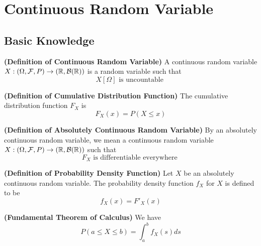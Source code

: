 \documentclass{report}
\begin{document}
\chapter{Continuous Random Variable}
\section{Basic Knowledge}
\begin{definition}
\label{2.0.1}
\textbf{(Definition of Continuous Random Variable)} A continuous random variable $X:(\Omega,\mathcal{F},P)\rightarrow (\mathbb{R},\mathcal{B}(\mathbb{R}))$ is a random variable such that 
\begin{equation}
X[\Omega]\text{ is uncountable }
\end{equation}
\end{definition}
\begin{definition}
\label{2.0.2}
\textbf{(Definition of Cumulative Distribution Function)} The cumulative distribution function $F_X$ is 
 \begin{equation}
F_X(x)=P(X\leq x)
\end{equation}
\end{definition}
\begin{definition}
\label{2.0.3}
\textbf{(Definition of Absolutely Continuous Random Variable)} By an absolutely continuous random variable, we mean a continuous random variable $X:(\Omega,\mathcal{F},P)\rightarrow (\mathbb{R},\mathcal{B}(\mathbb{R}))$ such that
\begin{equation}
F_X\text{ is differentiable everywhere }
\end{equation}
\end{definition}
\begin{definition}
\label{2.0.4}
\textbf{(Definition of Probability Density Function)} Let $X$ be an absolutely continuous random variable. The probability density function $f_X$ for $X$ is defined to be
\begin{equation}
f_X(x)=F'_X(x)
\end{equation}
\end{definition}
\begin{theorem}
\label{2.0.5}
\textbf{(Fundamental Theorem of Calculus)} We have
\begin{equation}
P(a\leq X\leq b)=\int_a^b f_X(s)ds
\end{equation}
\end{theorem}
\end{document}
